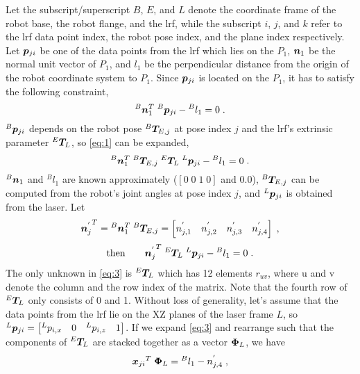 Let the subscript/superscript $B$, $E$, and $L$ denote the coordinate frame of the robot base, the robot flange, and the \ac{lrf}, while the subscript $i$, $j$, and $k$ refer to the \ac{lrf} data point index, the robot pose index, and the plane index respectively. Let $\vb*{p}_{ji}$ be one of the data points from the \ac{lrf} which lies on the $P_1$, $\vb*{n}_1$ be the normal unit vector of $P_1$, and $l_1$ be the perpendicular distance from the origin of the robot coordinate system to $P_1$.  Since $\vb*{p}_{ji}$ is located on the $P_1$, it has to satisfy the following constraint, 
  \begin{equation}
  \label{eq:1}
  {^B}\vb*{n}_1 ^T \; {^B}\vb*{p}_{ji}  - {^B}l_1 = 0 \; .
   \end{equation}
${^B}\vb*{p}_{ji}$ depends on the robot pose ${^B}\vb*{T}_{E,j}$ at pose index $j$ and the \ac{lrf}'s extrinsic parameter ${^E}\vb*{T}_L$, so \eqref{eq:1}  can be expanded,
  \begin{equation}
  {{^B}\vb*{n}_1 ^{T}} \; {^B}\vb*{T}_{E,j} \; {^E}\vb*{T}_L \; {^L}\vb*{p}_{ji}  - {^B}l_1 = 0 \; .
  \end{equation}
${^B}\vb*{n}_1$ and $^{B}l_1$ are known approximately ($[0 \; 0\; 1\;0]$ and $0.0$), ${^B}\vb*{T}_{E,j}$ can be computed from the robot's joint angles at pose index $j$, and ${^L}\vb*{p}_{ji}$ is obtained from the laser. Let 
\begin{equation}
{\vb*{n}_j^{'}}^{T} = {^B}\vb*{n}_1 ^T \; {^B}\vb*{T}_{E,j} = 
\left[n^{'}_{j,1} \quad n^{'}_{j,2} \quad n^{'}_{j,3}  \quad n^{'}_{j,4} \right] \; , 
\end{equation} 
\begin{equation}
  \label{eq:3}
 \mathrm{then} \quad \quad {\vb*{n}_j^{'}} ^T \; {^E}\vb*{T}_L \; {^L}\vb*{p}_{ji} - {^B}l_1 = 0 \; .
  \end{equation}
The only unknown in \eqref{eq:3} is ${^E}\vb*{T}_L$ which has 12 elements $r_{uv}$, where u and v denote the column and the row index of the matrix. Note that the fourth row of ${^E}\vb*{T}_L$ only consists of 0 and 1. 
Without loss of generality, let's assume that the data points from the \ac{lrf} lie on the XZ planes of the laser frame $L$, so ${^L}\vb*{p}_{ji} = \left[{^L}p_{i,x} \quad 0 \quad {^L}p_{i,z}\quad 1\right]$. If we expand \eqref{eq:3} and rearrange such that the components of ${^E}\vb*{T}_L$ are stacked together as a vector $\vb*{\Phi}_L$, we have
\begin{equation}
\label{eq:4}
  {\vb*{x}_{ji}}^T \; \vb*{\Phi}_L = {^B}l_1 -  n^{'}_{j,4} \;,
\end{equation}
